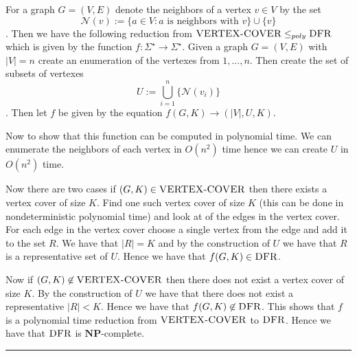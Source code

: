 \documentclass[11pt,twoside]{article}
\newcounter{problem}
\newcommand{\problembreak}{\bigskip\hrule\bigskip}
\newcommand{\NP}{\mathbf{NP}}
\begin{document}
For a graph $G=(V,E)$ denote the neighbors of a vertex $v\in V$ by the set $$\mathcal N(v):=\{a\in V: a\text{ is neighbors with }v\}\cup \{v\}$$. Then we have the following reduction from ${\normalfont{\textsc{VERTEX-COVER}}}\leq_{poly}{\normalfont{\textsc{DFR}}}$ which is given by the function $f:\Sigma^{\star}\to \Sigma^\star$. Given a graph $G=(V,E)$ with $|V|=n$ create an enumeration of the vertexes from $1,...,n$.  Then create the set of subsets of vertexes $$U:=\bigcup_{i=1}^n\{\mathcal{N}(v_i)\}$$. Then let $f$ be given by the equation $f(G,K)\to (|V|,U,K)$. 

Now to show that this function can be computed in polynomial time. We can enumerate the neighbors of each vertex in $O(n^2)$ time hence we can create $U$ in $O(n^2)$ time. 

Now there are two cases if $(G,K)\in{\normalfont{\textsc{VERTEX-COVER}}} $ then there exists a vertex cover of size $K$. Find one such vertex cover of size $K$ (this can be done in nondeterministic polynomial time) and look at of the edges in the vertex cover. For each edge in the vertex cover choose a single vertex from the edge and add it to the set $R$. We have that $|R|=K$ and by the construction of $U$ we have that $R$ is a representative set of $U$. Hence we have that $f(G,K)\in{\normalfont{\textsc{DFR}}}$.

Now if $(G,K)\not \in {\normalfont{\textsc{VERTEX-COVER}}}$ then there does not exist a vertex cover of size $K$. By the construction of $U$ we have that there does not exist a representative $|R|<K$. Hence we have that $f(G,K)\not \in {\normalfont{\textsc{DFR}}}$. This shows that $f$ is a polynomial time reduction from ${\normalfont{\textsc{VERTEX-COVER}}}$ to ${\normalfont{\textsc{DFR}}}$. Hence we have that ${\normalfont{\textsc{DFR}}}$ is $\NP$-complete.
\problembreak
\end{document}
